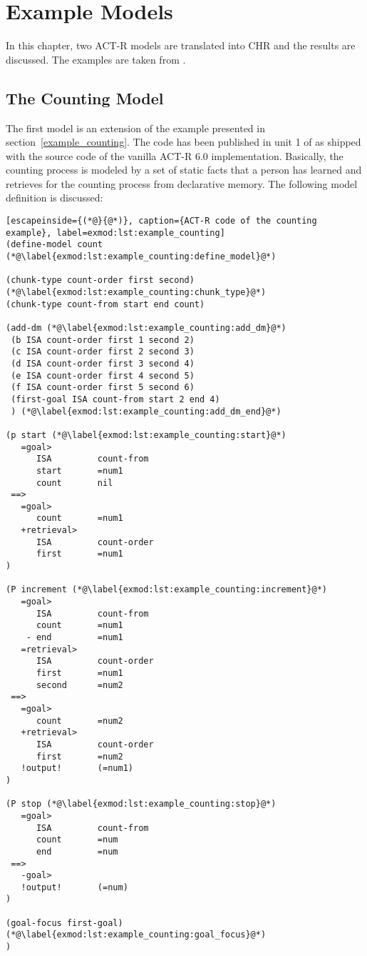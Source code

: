 \chapter{Example Models}
\label{example_models}

In this chapter, two ACT-R models are translated into CHR and the results are discussed. The examples are taken from  \cite{actr_tutorial}.

\section{The Counting Model}

The first model is an extension of the example presented in section~\ref{example_counting}. The code has been published in unit 1 of  \cite{actr_tutorial} as shipped with the source code of the vanilla ACT-R 6.0 implementation. Basically, the counting process is modeled by a set of static facts that a person has learned and retrieves for the counting process from declarative memory. The following model definition is discussed:

\begin{lstlisting}[escapeinside={(*@}{@*)}, caption={ACT-R code of the counting example}, label=exmod:lst:example_counting]
(define-model count (*@\label{exmod:lst:example_counting:define_model}@*)

(chunk-type count-order first second) (*@\label{exmod:lst:example_counting:chunk_type}@*)
(chunk-type count-from start end count)

(add-dm (*@\label{exmod:lst:example_counting:add_dm}@*)
 (b ISA count-order first 1 second 2)
 (c ISA count-order first 2 second 3)
 (d ISA count-order first 3 second 4)
 (e ISA count-order first 4 second 5)
 (f ISA count-order first 5 second 6)
 (first-goal ISA count-from start 2 end 4)
 ) (*@\label{exmod:lst:example_counting:add_dm_end}@*)

(p start (*@\label{exmod:lst:example_counting:start}@*)
   =goal>
      ISA         count-from
      start       =num1
      count       nil
 ==>
   =goal>
      count       =num1
   +retrieval>
      ISA         count-order
      first       =num1
)

(P increment (*@\label{exmod:lst:example_counting:increment}@*)
   =goal>
      ISA         count-from
      count       =num1
    - end         =num1
   =retrieval>
      ISA         count-order
      first       =num1
      second      =num2
 ==>
   =goal>
      count       =num2
   +retrieval>
      ISA         count-order
      first       =num2
   !output!       (=num1)
)

(P stop (*@\label{exmod:lst:example_counting:stop}@*)
   =goal>
      ISA         count-from
      count       =num
      end         =num
 ==>
   -goal>
   !output!       (=num)
)

(goal-focus first-goal) (*@\label{exmod:lst:example_counting:goal_focus}@*)
)
\end{lstlisting}

